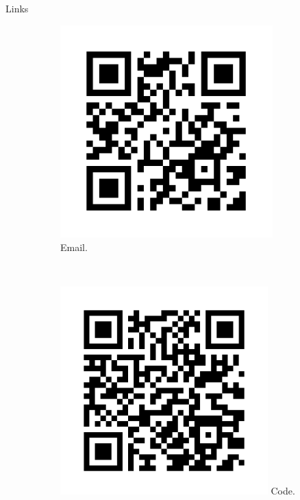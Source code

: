 \documentclass[20pt]{beamer}
\begin{document}
\begin{frame}[fragile,t]
\begin{columns}[t]
\begin{column}{0.33\linewidth}
\begin{block}{Links}
\vspace{0.5cm}

\begin{figure}
    \begin{subfigure}[b]{0.2\textwidth}
\centering
\includegraphics[width=0.90\textwidth]{images/qrcode_email_alber_ipia_at_inpe.png}\\
{Email.}
    \end{subfigure}
    ~
    \begin{subfigure}[b]{0.2\textwidth}
\centering
        \includegraphics[width=0.88\textwidth]{images/qrcode_seasonmetrics.png}
{Code.}
    \end{subfigure}
\end{figure}


\end{block}
\end{column}
\end{columns}
\end{frame}
\end{document}
